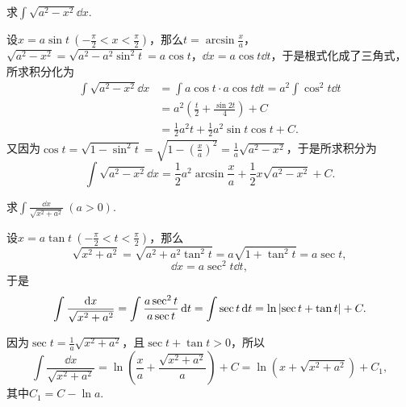 \begin{example}
求\(\int \sqrt{a^2 - x^2} \dd{x}\).
\begin{solution}
设\(x = a \sin t\ (-\frac{\pi}{2} < x < \frac{\pi}{2})\)，那么\(t = \arcsin\frac{x}{a}\)，\(\sqrt{a^2 - x^2} = \sqrt{a^2 - a^2 \sin^2 t} = a \cos t\)，\(\dd{x} = a \cos t \dd{t}\)，于是根式化成了三角式，所求积分化为\begin{align*}
\int \sqrt{a^2 - x^2} \dd{x}
&= \int a \cos t \cdot a \cos t \dd{t}
= a^2 \int \cos^2 t \dd{t} \\
&= a^2 \left( \frac{t}{2} + \frac{\sin 2t}{4} \right) + C \\
&= \frac{1}{2} a^2 t + \frac{1}{2} a^2 \sin t \cos t + C.
\end{align*}又因为\(\cos t = \sqrt{1 - \sin^2 t} = \sqrt{1 - \left(\frac{x}{a}\right)^2} = \frac{1}{a} \sqrt{a^2 - x^2}\)，于是所求积分为\[
\int \sqrt{a^2 - x^2} \dd{x}
= \frac{1}{2} a^2 \arcsin\frac{x}{a} + \frac{1}{2} x \sqrt{a^2 - x^2} + C.
\]
\end{solution}
\end{example}

\begin{example}
求\(\int \frac{\dd{x}}{\sqrt{x^2 + a^2}}\ (a>0)\).
\begin{solution}
设\(x = a \tan t\ (-\frac{\pi}{2} < t < \frac{\pi}{2})\)，那么\[
\sqrt{x^2 + a^2}
= \sqrt{a^2 + a^2 \tan^2 t}
= a \sqrt{1 + \tan^2 t}
= a \sec t,
\]\[
\dd{x} = a \sec^2 t \dd{t},
\]于是\[
\int \frac{\dd{x}}{\sqrt{x^2 + a^2}}
= \int \frac{a \sec^2 t}{a \sec t} \dd{t}
= \int \sec t \dd{t}
= \ln\abs{\sec t + \tan t} + C.
\]

因为\(\sec t = \frac{1}{a} \sqrt{x^2 + a^2}\)，且\(\sec t + \tan t > 0\)，所以\[
\int \frac{\dd{x}}{\sqrt{x^2 + a^2}}
= \ln( \frac{x}{a} + \frac{\sqrt{x^2 + a^2}}{a} ) + C
= \ln(x + \sqrt{x^2 + a^2}) + C_1,
\]其中\(C_1 = C - \ln a\).
\end{solution}
\end{example}

